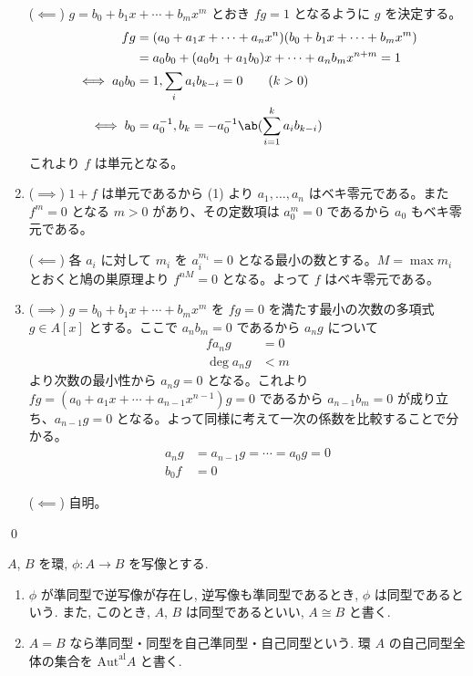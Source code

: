 \documentclass[uplatex,dvipdfmx,a4paper,11pt]{jlreq}
\makeatletter
\theoremstyle{definition}
\renewenvironment{proof}[1][\proofname]{\par
  \normalfont
  \topsep6\p@\@plus6\p@ \trivlist
  \item[\hskip\labelsep{\bfseries #1}\@addpunct{\bfseries}]\ignorespaces\quad\par
}{%
  \qed\endtrivlist\@endpefalse
}
\renewcommand\proofname{証明}
\makeatother
\begin{document}
\begin{proof}
\begin{enumerate}
          ($\impliedby$) $g = b_0 + b_1x + \cdots + b_mx^m$ とおき $fg = 1$ となるように $g$ を決定する。
          \begin{align}
            fg          & = (a_0 + a_1x + \cdots + a_nx^n)(b_0 + b_1x + \cdots + b_mx^m) \\
                        & = a_0b_0 + (a_0b_1 + a_1b_0)x + \cdots + a_nb_mx^{n+m} = 1     \\
            \iff a_0b_0 & = 1, \sum_{i}a_ib_{k - i} = 0 \qquad (k > 0)                   \\
            \iff b_0    & = a_0^{-1}, b_k = -a_0^{-1}\ab(\sum_{i=1}^{k}a_ib_{k-i})
          \end{align}
          これより $f$ は単元となる。
    \item ($\implies$) $1 + f$ は単元であるから (1) より $a_1,\ldots,a_n$ はベキ零元である。また $f^m = 0$ となる $m > 0$ があり、その定数項は $a_0^m = 0$ であるから $a_0$ もベキ零元である。

          ($\impliedby$) 各 $a_i$ に対して $m_i$ を $a_i^{m_i} = 0$ となる最小の数とする。$M = \max m_i$ とおくと鳩の巣原理より $f^{nM} = 0$ となる。よって $f$ はベキ零元である。
    \item ($\implies$) $g = b_0 + b_1x + \cdots + b_mx^m$ を $fg = 0$ を満たす最小の次数の多項式 $g\in A[x]$ とする。ここで $a_nb_m = 0$ であるから $a_ng$ について
          \begin{align}
            fa_ng     & = 0 \\
            \deg a_ng & < m
          \end{align}
          より次数の最小性から $a_ng = 0$ となる。これより $fg = (a_0 + a_1x + \cdots + a_{n-1}x^{n-1})g = 0$ であるから $a_{n-1}b_m = 0$ が成り立ち、$a_{n-1}g = 0$ となる。よって同様に考えて一次の係数を比較することで分かる。
          \begin{align}
            a_ng & = a_{n-1}g = \cdots = a_0g = 0 \\
            b_0f & = 0
          \end{align}

          ($\impliedby$) 自明。
  \end{enumerate}
\end{proof}


\begin{definition}[準同型・同型]
  $A$, $B$ を環, $\phi:A\to B$ を写像とする.
  \begin{enumerate}
    \item $\phi$ が準同型で逆写像が存在し, 逆写像も準同型であるとき, $\phi$ は同型であるという. また, このとき, $A$, $B$ は同型であるといい, $A\cong B$ と書く.
    \item $A = B$ なら準同型・同型を自己準同型・自己同型という. 環 $A$ の自己同型全体の集合を $\mathrm{Aut}^{\mathrm{al}}A$ と書く.
  \end{enumerate}
\end{definition}
\end{document}
